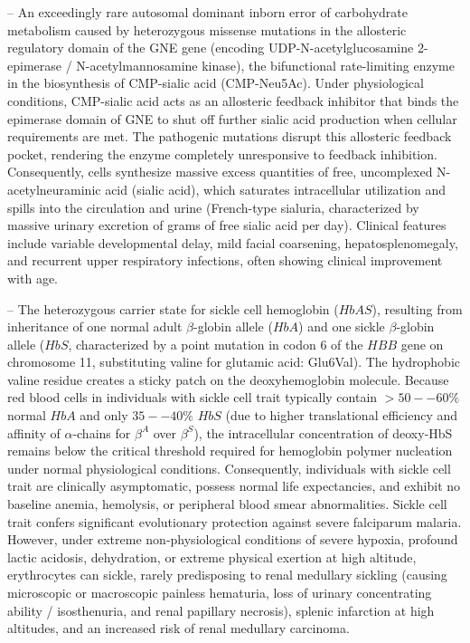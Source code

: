 -- An exceedingly rare autosomal dominant inborn error of carbohydrate metabolism caused by heterozygous missense mutations in the allosteric regulatory domain of the GNE gene (encoding UDP-N-acetylglucosamine 2-epimerase / N-acetylmannosamine kinase), the bifunctional rate-limiting enzyme in the biosynthesis of CMP-sialic acid (CMP-Neu5Ac). Under physiological conditions, CMP-sialic acid acts as an allosteric feedback inhibitor that binds the epimerase domain of GNE to shut off further sialic acid production when cellular requirements are met. The pathogenic mutations disrupt this allosteric feedback pocket, rendering the enzyme completely unresponsive to feedback inhibition. Consequently, cells synthesize massive excess quantities of free, uncomplexed N-acetylneuraminic acid (sialic acid), which saturates intracellular utilization and spills into the circulation and urine (French-type sialuria, characterized by massive urinary excretion of grams of free sialic acid per day). Clinical features include variable developmental delay, mild facial coarsening, hepatosplenomegaly, and recurrent upper respiratory infections, often showing clinical improvement with age.

-- The heterozygous carrier state for sickle cell hemoglobin ($HbAS$), resulting from inheritance of one normal adult $\beta$-globin allele ($HbA$) and one sickle $\beta$-globin allele ($HbS$, characterized by a point mutation in codon 6 of the $HBB$ gene on chromosome 11, substituting valine for glutamic acid: Glu6Val). The hydrophobic valine residue creates a sticky patch on the deoxyhemoglobin molecule. Because red blood cells in individuals with sickle cell trait typically contain $>50--60\%$ normal $HbA$ and only $35--40\%$ $HbS$ (due to higher translational efficiency and affinity of $\alpha$-chains for $\beta^A$ over $\beta^S$), the intracellular concentration of deoxy-HbS remains below the critical threshold required for hemoglobin polymer nucleation under normal physiological conditions. Consequently, individuals with sickle cell trait are clinically asymptomatic, possess normal life expectancies, and exhibit no baseline anemia, hemolysis, or peripheral blood smear abnormalities. Sickle cell trait confers significant evolutionary protection against severe falciparum malaria. However, under extreme non-physiological conditions of severe hypoxia, profound lactic acidosis, dehydration, or extreme physical exertion at high altitude, erythrocytes can sickle, rarely predisposing to renal medullary sickling (causing microscopic or macroscopic painless hematuria, loss of urinary concentrating ability / isosthenuria, and renal papillary necrosis), splenic infarction at high altitudes, and an increased risk of renal medullary carcinoma.

